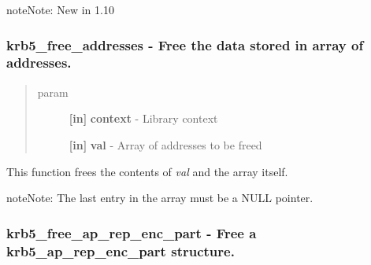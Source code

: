 \documentclass[letterpaper,10pt,english]{sphinxmanual}
\begin{document}
\begin{notice}{note}{Note:}
New in 1.10
\end{notice}


\subsubsection{krb5\_free\_addresses -  Free the data stored in array of addresses.}
\label{appdev/refs/api/krb5_free_addresses:krb5-free-addresses-free-the-data-stored-in-array-of-addresses}\label{appdev/refs/api/krb5_free_addresses::doc}

\begin{fulllineitems}
\label{appdev/refs/api/krb5_free_addresses:c.krb5_free_addresses}
\end{fulllineitems}

\begin{quote}\begin{description}
\item[{param}] \leavevmode
\textbf{{[}in{]}} \textbf{context} - Library context

\textbf{{[}in{]}} \textbf{val} - Array of addresses to be freed

\end{description}\end{quote}

This function frees the contents of \emph{val} and the array itself.

\begin{notice}{note}{Note:}
The last entry in the array must be a NULL pointer.
\end{notice}


\subsubsection{krb5\_free\_ap\_rep\_enc\_part -  Free a krb5\_ap\_rep\_enc\_part structure.}
\label{appdev/refs/api/krb5_free_ap_rep_enc_part:krb5-free-ap-rep-enc-part-free-a-krb5-ap-rep-enc-part-structure}\label{appdev/refs/api/krb5_free_ap_rep_enc_part::doc}

\begin{fulllineitems}
\label{appdev/refs/api/krb5_free_ap_rep_enc_part:c.krb5_free_ap_rep_enc_part}
\end{fulllineitems}
\end{document}
